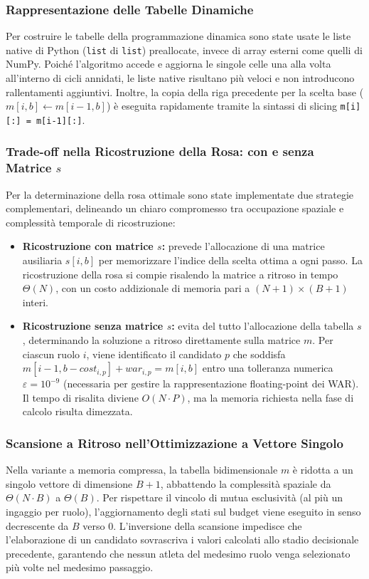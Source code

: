 \subsubsection{Rappresentazione delle Tabelle Dinamiche}
Per costruire le tabelle della programmazione dinamica sono state usate le liste native di Python (\texttt{list} di \texttt{list}) preallocate, invece di array esterni come quelli di NumPy. Poiché l'algoritmo accede e aggiorna le singole celle una alla volta all'interno di cicli annidati, le liste native risultano più veloci e non introducono rallentamenti aggiuntivi. Inoltre, la copia della riga precedente per la scelta base ($m[i, b] \gets m[i - 1, b]$) è eseguita rapidamente tramite la sintassi di slicing \texttt{m[i][:] = m[i-1][:]}.

\subsubsection{Trade-off nella Ricostruzione della Rosa: con e senza Matrice \texorpdfstring{$s$}{s}}
Per la determinazione della rosa ottimale sono state implementate due strategie complementari, delineando un chiaro compromesso tra occupazione spaziale e complessità temporale di ricostruzione:
\begin{itemize}
	\item \textbf{Ricostruzione con matrice $s$:} prevede l'allocazione di una matrice ausiliaria $s[i, b]$ per memorizzare l'indice della scelta ottima a ogni passo. La ricostruzione della rosa si compie risalendo la matrice a ritroso in tempo $\Theta(N)$, con un costo addizionale di memoria pari a $(N+1) \times (B+1)$ interi.
	\item \textbf{Ricostruzione senza matrice $s$:} evita del tutto l'allocazione della tabella $s$, determinando la soluzione a ritroso direttamente sulla matrice $m$. Per ciascun ruolo $i$, viene identificato il candidato $p$ che soddisfa $m[i-1, b - \mathit{cost}_{i, p}] + \mathit{war}_{i, p} = m[i, b]$ entro una tolleranza numerica $\varepsilon = 10^{-9}$ (necessaria per gestire la rappresentazione floating-point dei WAR). Il tempo di risalita diviene $O(N \cdot P)$, ma la memoria richiesta nella fase di calcolo risulta dimezzata.
\end{itemize}

\subsubsection{Scansione a Ritroso nell'Ottimizzazione a Vettore Singolo}
Nella variante a memoria compressa, la tabella bidimensionale $m$ è ridotta a un singolo vettore di dimensione $B+1$, abbattendo la complessità spaziale da $\Theta(N \cdot B)$ a $\Theta(B)$. Per rispettare il vincolo di mutua esclusività (al più un ingaggio per ruolo), l'aggiornamento degli stati sul budget viene eseguito in senso decrescente da $B$ verso $0$. L'inversione della scansione impedisce che l'elaborazione di un candidato sovrascriva i valori calcolati allo stadio decisionale precedente, garantendo che nessun atleta del medesimo ruolo venga selezionato più volte nel medesimo passaggio.

